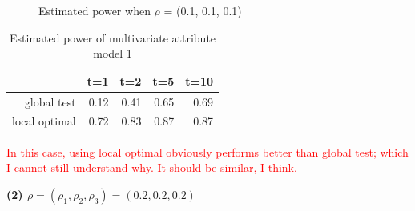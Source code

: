 \documentclass[12pt]{report}
\begin{document}
\begin{figure}[H]
\caption{Estimated power when $\rho$ = (0.1, 0.1, 0.1)}
\label{fig:multi1}    
\end{figure} 
 
\begin{table}[ht]
\centering
\begin{tabular}{rrrrr}
  \hline
 & t=1 & t=2 & t=5 & t=10 \\ 
  \hline
global test & 0.12 & 0.41 & 0.65 & 0.69 \\ 
  local optimal & 0.72 & 0.83 & 0.87 & 0.87 \\ 
   \hline
\end{tabular}
\caption{Estimated power of multivariate attribute model 1}
\end{table}

\textcolor{red}{In this case, using local optimal obviously performs better than global test; which I cannot still understand why. It should be similar, I think.}


\newpage
\textbf{(2) $\rho = (\rho_{1}, \rho_{2}, \rho_{3}) = (0.2, 0.2, 0.2)$}
\end{document}
